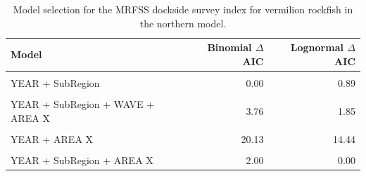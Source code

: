 \documentclass[11pt,
  english,
]{article}
\begin{document}
\FloatBarrier

\begin{table}

\caption{\label{tab:tab-model-select-mrfss}Model selection for the MRFSS dockside survey index for vermilion rockfish in the northern model.}
\centering
\begin{tabular}[t]{lrr}
\toprule
Model & Binomial $\Delta$AIC & Lognormal $\Delta$AIC\\
\midrule
\cellcolor{gray!6}{1} & \cellcolor{gray!6}{65.99} & \cellcolor{gray!6}{106.17}\\
YEAR + SubRegion & 0.00 & 0.89\\
\cellcolor{gray!6}{YEAR + SubRegion + WAVE} & \cellcolor{gray!6}{1.77} & \cellcolor{gray!6}{3.03}\\
YEAR + SubRegion + WAVE + AREA X & 3.76 & 1.85\\
\cellcolor{gray!6}{YEAR + WAVE} & \cellcolor{gray!6}{22.05} & \cellcolor{gray!6}{21.16}\\
\addlinespace
YEAR + AREA X & 20.13 & 14.44\\
\cellcolor{gray!6}{YEAR + WAVE + AREA X} & \cellcolor{gray!6}{22.67} & \cellcolor{gray!6}{16.13}\\
YEAR + SubRegion + AREA X & 2.00 & 0.00\\
\bottomrule
\end{tabular}
\end{table}

\FloatBarrier
\end{document}
